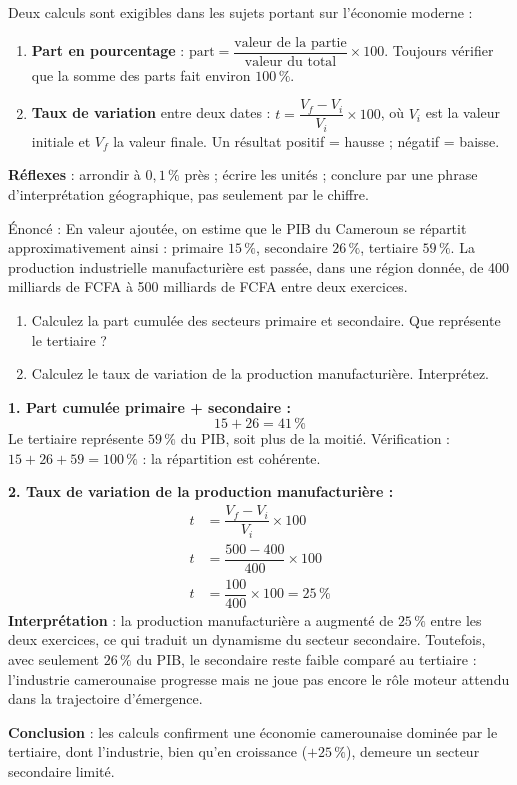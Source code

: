 \documentclass[11pt]{article}
\begin{document}
\begin{methode}
Deux calculs sont exigibles dans les sujets portant sur l'économie moderne :
\begin{enumerate}
\item \textbf{Part en pourcentage} : $\text{part} = \dfrac{\text{valeur de la partie}}{\text{valeur du total}} \times 100$. Toujours vérifier que la somme des parts fait environ $100\,\%$.
\item \textbf{Taux de variation} entre deux dates : $t = \dfrac{V_f - V_i}{V_i} \times 100$, où $V_i$ est la valeur initiale et $V_f$ la valeur finale. Un résultat positif = hausse ; négatif = baisse.
\end{enumerate}
\textbf{Réflexes} : arrondir à $0,1\,\%$ près ; écrire les unités ; conclure par une phrase d'interprétation géographique, pas seulement par le chiffre.
\end{methode}

\begin{exoresolu}
Énoncé : En valeur ajoutée, on estime que le PIB du Cameroun se répartit approximativement ainsi : primaire $15\,\%$, secondaire $26\,\%$, tertiaire $59\,\%$. La production industrielle manufacturière est passée, dans une région donnée, de 400 milliards de FCFA à 500 milliards de FCFA entre deux exercices.
\begin{enumerate}
\item Calculez la part cumulée des secteurs primaire et secondaire. Que représente le tertiaire ?
\item Calculez le taux de variation de la production manufacturière. Interprétez.
\end{enumerate}
\tcblower
\textbf{1. Part cumulée primaire + secondaire :}
\[ 15 + 26 = 41\,\% \]
Le tertiaire représente $59\,\%$ du PIB, soit plus de la moitié. Vérification : $15 + 26 + 59 = 100\,\%$ : la répartition est cohérente.

\textbf{2. Taux de variation de la production manufacturière :}
\begin{align*}
t &= \dfrac{V_f - V_i}{V_i} \times 100 \\
t &= \dfrac{500 - 400}{400} \times 100 \\
t &= \dfrac{100}{400} \times 100 = 25\,\%
\end{align*}
\textbf{Interprétation} : la production manufacturière a augmenté de $25\,\%$ entre les deux exercices, ce qui traduit un dynamisme du secteur secondaire. Toutefois, avec seulement $26\,\%$ du PIB, le secondaire reste faible comparé au tertiaire : l'industrie camerounaise progresse mais ne joue pas encore le rôle moteur attendu dans la trajectoire d'émergence.

\textbf{Conclusion} : les calculs confirment une économie camerounaise dominée par le tertiaire, dont l'industrie, bien qu'en croissance ($+25\,\%$), demeure un secteur secondaire limité.
\end{exoresolu}
\end{document}
